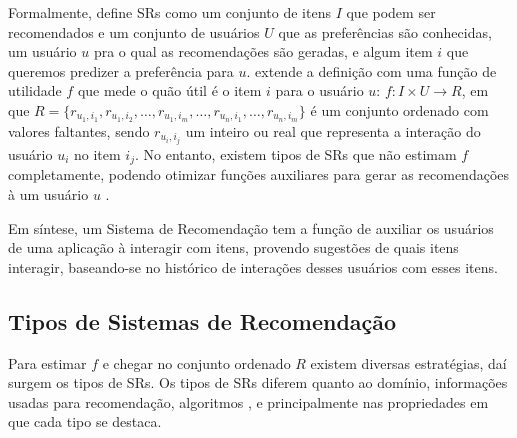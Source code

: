 \documentclass[normaltoc, espacoumemeio, pnumromarab,ruledheader]{abnt}
\begin{document}
Formalmente,  define SRs como um conjunto de itens $I$  que podem ser recomendados e um conjunto de usuários $U$ que as preferências são conhecidas, um usuário $u$ pra o qual as recomendações são geradas, e algum item $i$ que queremos predizer a preferência para $u$.
 extende a definição com uma função de utilidade $f$ que mede o quão útil é o item $i$ para o usuário $u$: $f: I \times U \rightarrow R$, em que $R = \{ r_{u_1,i_1}, r_{u_1,i_2}, \dots, r_{u_1,i_m}, \dots, r_{u_n,i_1}, \dots, r_{u_n,i_m} \}$ é um conjunto ordenado com valores faltantes, sendo $r_{u_i,i_j}$ um inteiro ou real que representa a interação do usuário $u_i$ no item $i_j$.
No entanto, existem tipos de SRs que não estimam $f$ completamente, podendo otimizar funções auxiliares para gerar as recomendações à um usuário $u$ \cite{Lops2011}.

Em síntese, um Sistema de Recomendação tem a função de auxiliar os usuários de uma aplicação à interagir com itens, provendo sugestões de quais itens interagir, baseando-se no histórico de interações desses usuários com esses itens.

 \subsection{Tipos de Sistemas de Recomendação}
 \label{subsec:tipossr}

Para estimar $f$ e chegar no conjunto ordenado $R$ existem diversas estratégias, daí surgem os tipos de SRs.
Os tipos de SRs diferem quanto ao domínio, informações usadas para recomendação, algoritmos \cite{Feldman2006}, e principalmente nas propriedades em que cada tipo se destaca.
\end{document}
